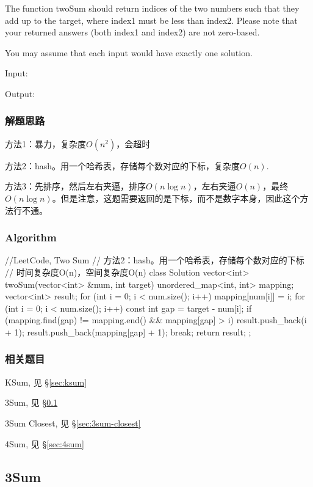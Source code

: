 The function twoSum should return indices of the two numbers such that they add 
up to the target, where index1 must be less than index2. Please note that your 
returned answers (both index1 and index2) are not zero-based.

You may assume that each input would have exactly one solution.

Input:  

Output: 


\subsubsection{解题思路}
方法1：暴力，复杂度$O(n^2)$，会超时

方法2：hash。用一个哈希表，存储每个数对应的下标，复杂度$O(n)$.

方法3：先排序，然后左右夹逼，排序$O(n\log n)$，左右夹逼$O(n)$，最终$O(n\log 
n)$。但是注意，这题需要返回的是下标，而不是数字本身，因此这个方法行不通。


\subsubsection{Algorithm}
\begin{Code}
	//LeetCode, Two Sum
	// 方法2：hash。用一个哈希表，存储每个数对应的下标
	// 时间复杂度O(n)，空间复杂度O(n)
	class Solution {
		vector<int> twoSum(vector<int> &num, int target) {
			unordered_map<int, int> mapping;
			vector<int> result;
			for (int i = 0; i < num.size(); i++) 
				mapping[num[i]] = i;
			for (int i = 0; i < num.size(); i++) {
				const int gap = target - num[i];
				if (mapping.find(gap) != mapping.end() && mapping[gap] > i) {
					result.push_back(i + 1);
					result.push_back(mapping[gap] + 1);
					break;
				}
			}
			return result;
		}
	};
\end{Code}


\subsubsection{相关题目}
\begindot
\item KSum, 见 \S \ref{sec:ksum}
\item 3Sum, 见 \S \ref{sec:3sum}
\item 3Sum Closest, 见 \S \ref{sec:3sum-closest}
\item 4Sum, 见 \S \ref{sec:4sum}
\myenddot


\subsection{3Sum} %
\label{sec:3sum}


